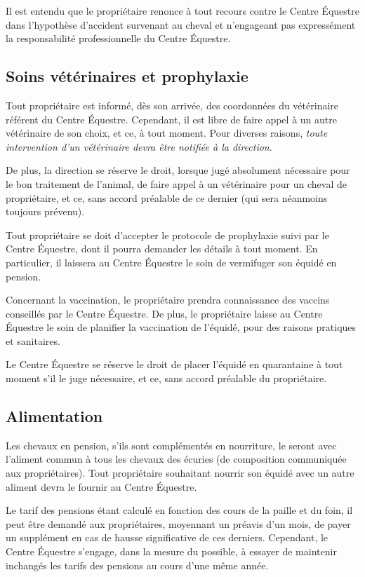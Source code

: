 \documentclass[11pt,a4paper]{article}
\begin{document}
   Il est entendu que le propriétaire renonce à tout recours contre le Centre Équestre dans l'hypothèse d'accident survenant au cheval et n'engageant pas expressément la responsabilité professionnelle du Centre Équestre.

   \subsection*{Soins vétérinaires et prophylaxie}
   Tout propriétaire est informé, dès son arrivée, des coordonnées du vétérinaire référent du Centre Équestre.
   Cependant, il est libre de faire appel à un autre vétérinaire de son choix, et ce, à tout moment.
   Pour diverses raisons, \emph{toute intervention d'un vétérinaire devra être notifiée à la direction}.

   De plus, la direction se réserve le droit, lorsque jugé absolument nécessaire pour le bon traitement de l'animal, de faire appel à un vétérinaire pour un cheval de propriétaire, et ce, sans accord préalable de ce dernier (qui sera néanmoins toujours prévenu).

   Tout propriétaire se doit d'accepter le protocole de prophylaxie suivi par le Centre Équestre, dont il pourra demander les détails à tout moment.
   En particulier, il laissera au Centre Équestre le soin de vermifuger son équidé en pension.

   Concernant la vaccination, le propriétaire prendra connaissance des vaccins conseillés par le Centre Équestre.
   De plus, le propriétaire laisse au Centre Équestre le soin de planifier la vaccination de l'équidé, pour des raisons pratiques et sanitaires.

   Le Centre Équestre se réserve le droit de placer l'équidé en quarantaine à tout moment s'il le juge nécessaire, et ce, sans accord préalable du propriétaire.

   \subsection*{Alimentation}
   Les chevaux en pension, s'ils sont complémentés en nourriture, le seront avec l'aliment commun à tous les chevaux des écuries (de composition communiquée aux propriétaires).
   Tout propriétaire souhaitant nourrir son équidé avec un autre aliment devra le fournir au Centre Équestre.

   Le tarif des pensions étant calculé en fonction des cours de la paille et du foin, il peut être demandé aux propriétaires, moyennant un préavis d'un mois, de payer un supplément en cas de hausse significative de ces derniers.
   Cependant, le Centre Équestre s'engage, dans la mesure du possible, à essayer de maintenir inchangés les tarifs des pensions au cours d'une même année.
\end{document}
